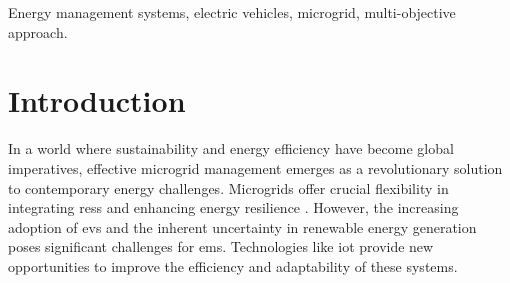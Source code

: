 \documentclass[preprint, 10pt, 5p]{elsarticle}
\begin{document}
\begin{frontmatter}
    \begin{abstract}
        The integration of various \glspl{der}, \glspl{bess}, \gls{pv} systems, 
        and \gls{ev} chargers, introduces new complexities 
        in managing electrical distribution systems. The main challenge 
        involves devising an optimized day-ahead \gls{ems} 
        tailored for three-phase unbalanced AC microgrids while accounting for
        uncertainties in \gls{pv} generation and nodal demands.
        Additionally, the \gls{ems} must prepare the microgrid for potential 
        transitions between grid-connected and islanded modes due to unexpected
        grid outages. The proposed \gls{ems} is specifically designed for 
        microgrids comprising \gls{pv} generation, \gls{bess}, \gls{ev} chargers, and variable demand, facilitating efficient 
        day-ahead planning. Furthermore, the inclusion of contingency 
        constraints ensures a transition between grid-connected and
        islanded modes, augmenting grid resilience. A multi-objective approach is considered to minimize the operation costs from the main grid and energy non-supplied for the EVs.
        To evaluate the proposed EMS, actual data from the \Gls{campus} 
        at the \gls{unicamp} was utilized. 
        The proposed \gls{minlp} model undergoes a
        transformation into a \gls{milp} model through a 
        series of linearizations. The model was implemented using Python 
        Optimization Modeling Objects (Pyomo) and solved using the open-source 
        CBC solver. Results confirm the robustness and efficacy of the proposed 
        \gls{ems} in improving the performance and resilience of three-phase 
        unbalanced AC microgrids.
    \end{abstract}
    \begin{keyword}
        Energy management systems, electric vehicles, microgrid, 
        multi-objective approach.
    \end{keyword}
\end{frontmatter}


\glsresetall
\section{Introduction}\label{sec:intro}

In a world where sustainability and energy efficiency have become global 
imperatives, effective microgrid management emerges as a revolutionary 
solution to contemporary energy challenges. Microgrids offer crucial 
flexibility in integrating \glspl{res} and enhancing energy 
resilience \cite{uddin2023}. However, the increasing adoption of \glspl{ev} 
and the inherent uncertainty in renewable energy generation poses significant challenges for \gls{ems}. Technologies 
like \gls{iot} provide new opportunities to improve the 
efficiency and adaptability of these systems. 
\end{document}

